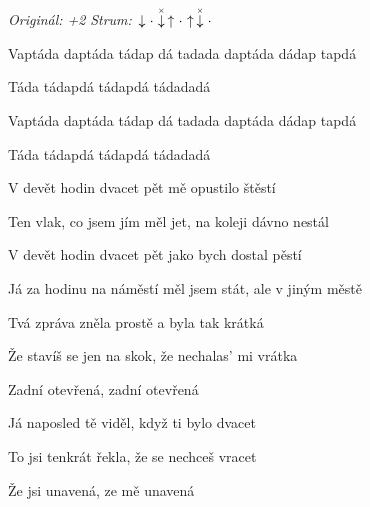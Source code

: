 \begin{song}


\begin{headerbox}
\RaiseBoxWithChucks
{} \quad
\textit{Originál: +2} \quad
\textit{Strum:} $\Down\Miss\ChuckDown\Up\Miss\Up\ChuckDown\Miss$ 
\end{headerbox}

\begin{hchordbox}
\end{hchordbox}

\Large

\bigskip

\begin{chorusbox}{\Refren}
Vaptáda daptáda tádap dá tadada daptáda dádap tapdá \par
Táda tádapdá tádapdá tádadadá  \par
{}Vaptáda daptáda tádap dá tadada daptáda dádap tapdá \par
Táda tádapdá tádapdá tádadadá  \par
\end{chorusbox}

\bigskip

V devět hodin dvacet pět  mě opustilo štěstí \par
Ten vlak, co jsem jím měl jet, na koleji  dávno nestál \par
{}V devět hodin dvacet pět  jako bych dostal pěstí \par
Já za hodinu na náměstí měl jsem stát, ale v jiným městě

\bigskip

Tvá zpráva zněla prostě a byla tak krátká \par
Že stavíš se jen na skok, že nechalas' mi vrátka \par
{}Zadní otevřená, zadní otevřená

\bigskip

Já naposled tě viděl, když ti bylo dvacet \par
{}To jsi tenkrát řekla, že se nechceš vracet \par
{}Že jsi unavená, ze mě unavená \par


\end{song}

